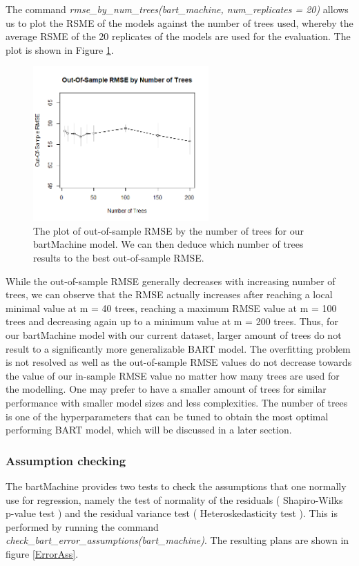 \documentclass{usiinftr}
\begin{document}
The command \textit{rmse\_by\_num\_trees(bart\_machine, num\_replicates = 20)} allows us to plot the RSME of the models against the number of trees used, whereby the average RSME of the 20 replicates of the models are used for the evaluation. The plot is shown in Figure \ref{RMSEtrees}.

\begin{figure}[h!] 
\centering
\includegraphics[width=0.6\textwidth]{images/RMSEtrees.png}
\caption{The plot of out-of-sample RMSE by the number of trees for our bartMachine model. We can then deduce which number of trees results to the best out-of-sample RMSE.}
\label{RMSEtrees}
\end{figure}

While the out-of-sample RMSE generally decreases with increasing number of trees, we can observe that the RMSE actually increases after reaching a local minimal value at m = 40 trees, reaching a maximum RMSE value at m = 100 trees and decreasing again up to a minimum value at m = 200 trees. Thus, for our bartMachine model with our current dataset, larger amount of trees do not result to a significantly more generalizable BART model. The overfitting problem is not resolved as well as the out-of-sample RMSE values do not decrease towards the value of our in-sample RMSE value no matter how many trees are used for the modelling. One may prefer to have a smaller amount of trees for similar performance with smaller model sizes and less complexities. The number of trees is one of the hyperparameters that can be tuned to obtain the most optimal performing BART model, which will be discussed in a later section.

\subsubsection{Assumption checking}
The bartMachine provides two tests to check the assumptions that one normally use for regression, namely the test of normality of the residuals ( Shapiro-Wilks p-value test ) and the residual variance test ( Heteroskedasticity test ). This is performed by running the command \textit{check\_bart\_error\_assumptions(bart\_machine)}. The resulting plans are shown in figure \ref{ErrorAss}.
\end{document}
